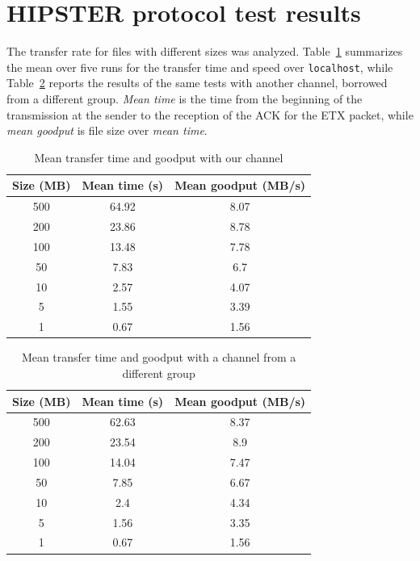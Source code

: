 \documentclass[10pt,twocolumn]{article}
\begin{document}
\section{HIPSTER protocol test results}
The transfer rate for files with different sizes was analyzed.
Table~\ref{table:ourChannel} summarizes the mean over five runs for the
transfer time and speed over \texttt{localhost}, while
Table~\ref{table:anotherChannel} reports the results of the same tests with
another channel, borrowed from a different group. \textit{Mean time} is the time from the beginning of the transmission at the sender to the reception of the ACK for the ETX packet, while \textit{mean goodput} is file size over \textit{mean time}.
\begin{table}[h]
\centering
\begin{tabular}{|c|c|c|}
	Size (MB) & Mean time (s) & Mean goodput (MB/s)\\ \hline
  500       & 64.92    & 8.07  \\
  200       & 23.86    & 8.78  \\
	100       & 13.48    & 7.78  \\
	50        & 7.83     & 6.7 \\
	10        & 2.57     & 4.07 \\
	5         & 1.55     & 3.39  \\
	1         & 0.67     & 1.56  \\ \hline
\end{tabular}
\caption{Mean transfer time and goodput with our channel}
\label{table:ourChannel}
\end{table}

\begin{table}[h]
\centering
\begin{tabular}{|c|c|c|}
  Size (MB) & Mean time (s) & Mean goodput (MB/s)\\ \hline
  500       & 62.63    & 8.37  \\
  200       & 23.54    & 8.9  \\
  100       & 14.04    & 7.47  \\
  50        & 7.85     & 6.67 \\
  10        & 2.4      & 4.34 \\
  5         & 1.56     & 3.35 \\
  1         & 0.67     & 1.56 \\ \hline
\end{tabular}
\caption{Mean transfer time and goodput with a channel from a different group}
\label{table:anotherChannel}
\end{table}
\end{document}

